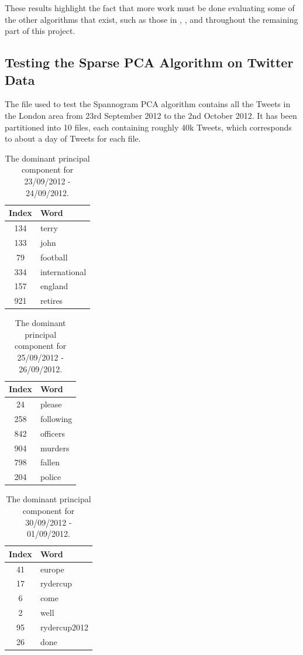 \documentclass[11pt,a4paper]{article}
\begin{document}
These results highlight the fact that more work must be done evaluating some of the other algorithms that exist, such as those in \cite{shen}, \cite{zou}, \cite{daspremont} and \cite{asteris} throughout the remaining part of this project.

\clearpage 
\subsection{Testing the Sparse PCA Algorithm on Twitter Data}
The file used to test the Spannogram PCA algorithm contains all the Tweets in the London area from 23rd September 2012 to the 2nd October 2012. It has been partitioned into 10 files, each containing roughly 40k Tweets, which corresponds to about a day of Tweets for each file.

\begin{table}[H]
\center
\begin{tabular}{| c l |}
\hline
Index & Word \\
\hline
134 & terry\\
133 & john\\
79 & football\\
334 & international\\
157 & england\\
921 & retires\\
\hline
\end{tabular}
\caption{The dominant principal component for 23/09/2012 - 24/09/2012.}
\label{john_terry}
\end{table}

\begin{table}[H]
\center
\begin{tabular}{| c l |}
\hline
Index & Word \\
\hline
24 & please\\
258 & following\\
842 & officers\\
904 & murders\\
798 & fallen\\
204 & police\\
\hline
\end{tabular}
\caption{The dominant principal component for 25/09/2012 - 26/09/2012.}
\label{murder}
\end{table}

\begin{table}[H]
\center
\begin{tabular}{| c l |}
\hline
Index & Word \\
\hline
41 & europe\\
17 & rydercup\\
6 & come\\
2 & well\\
95 & rydercup2012\\
26 & done\\
\hline
\end{tabular}
\caption{The dominant principal component for 30/09/2012 - 01/09/2012.}
\label{ryder_cup}
\end{table}
\end{document}
